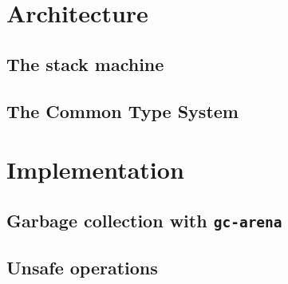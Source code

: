 \section{Architecture}

\subsection{The stack machine}

\subsection{The Common Type System}

\section{Implementation}

\subsection{Garbage collection with \texttt{gc-arena}}

\subsection{Unsafe operations}
